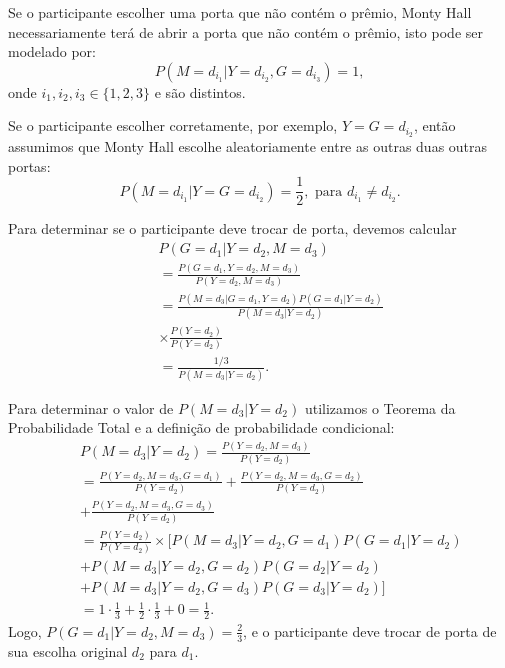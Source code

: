 \begin{frame}
\begin{block}{}
	
	Se o participante escolher uma porta que não contém o prêmio, Monty Hall necessariamente terá de abrir a porta que não contém o prêmio, isto pode ser modelado por:
	$$P(M=d_{i_1}|Y=d_{i_2},G=d_{i_3})=1,$$
	onde $i_1, i_2, i_3\in \{1,2,3\}$ e são distintos.
\end{block}

\begin{block}{}
	Se o participante escolher corretamente, por exemplo, $Y=G=d_{i_2}$, então assumimos que Monty Hall escolhe aleatoriamente entre as outras duas outras portas:
	$$P(M=d_{i_1}|Y=G=d_{i_2})=\frac{1}{2}, \mbox{ para }d_{i_1}\ne d_{i_2}.
	$$
	
\end{block}
Para determinar se o participante deve trocar de porta, devemos calcular
\begin{eqnarray}
& & P(G=d_1|Y=d_2,M=d_3) \nonumber \\
& & =\frac{P(G=d_1,Y=d_2,M=d_3)}{P(Y=d_2,M=d_3)} \nonumber\\
& & =\frac{P(M=d_3|G=d_1,Y=d_2)P(G=d_1|Y=d_2)}{P(M=d_3|Y=d_2)} \nonumber \\
& & \times \frac{P(Y=d_2)}{P(Y=d_2)} \nonumber \\
& & =\frac{1/3}{P(M=d_3|Y=d_2)}. \nonumber
\end{eqnarray}

\end{frame}


\begin{frame}
Para determinar o valor de $P(M=d_3|Y=d_2)$ utilizamos o Teorema da Probabilidade Total e a definição de probabilidade condicional:
\begin{eqnarray}
& & P(M=d_3|Y=d_2)=\frac{P(Y=d_2,M=d_3)}{P(Y=d_2)} \nonumber\\
& & =\frac{P(Y=d_2,M=d_3,G=d_1)}{P(Y=d_2)} + \frac{P(Y=d_2,M=d_3,G=d_2)}{P(Y=d_2)} \nonumber \\
& & +\frac{P(Y=d_2,M=d_3,G=d_3)}{P(Y=d_2)} \nonumber \\
& & =\frac{P(Y=d_2)}{P(Y=d_2)}\times [P(M=d_3|Y=d_2,G=d_1)P(G=d_1|Y=d_2)\nonumber \\
& & +P(M=d_3|Y=d_2,G=d_2)P(G=d_2|Y=d_2)\nonumber\\
& & +P(M=d_3|Y=d_2,G=d_3)P(G=d_3|Y=d_2)]\nonumber \\
& & =1\cdot \frac{1}{3}+\frac{1}{2}\cdot\frac{1}{3}+0=\frac{1}{2}.\nonumber
\end{eqnarray}
Logo, $P(G=d_1|Y=d_2,M=d_3)=\frac{2}{3}$, e o participante deve trocar de porta de sua escolha original $d_2$ para $d_1.$
\end{frame}



